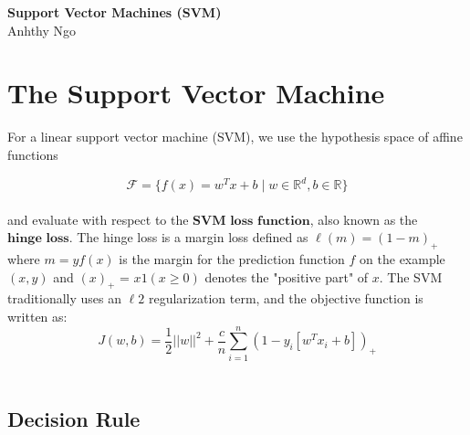 \documentclass[12pt]{article}
\begin{document}
\begin{center}
    \Large \textbf{Support Vector Machines (SVM)} \\
    \small Anhthy Ngo
\end{center}

\section{The Support Vector Machine}



For a linear support vector machine (SVM), we use the hypothesis space of affine functions

$$\mathcal{F} = \{f(x) = w^{T}x + b \mid w \in \mathbb{R}^{d},b \in \mathbb{R}\}$$\\
and evaluate with respect to the $\textbf{SVM loss function}$, also known as the $\textbf{hinge loss}$. The hinge loss is a margin loss defined as $\ell(m) = (1-m)_{+}$ where $m = yf(x)$ is the margin for the prediction function $f$ on the example $(x,y)$ and $(x)_{+}$ = $x1(x \geq 0)$ denotes the "positive part" of $x$. The SVM traditionally uses an $\ell 2$ regularization term, and the objective function is written as:
$$J(w,b) = \frac{1}{2} \lvert \lvert w \rvert \rvert^{2} + \frac{c}{n} \sum_{i=1}^{n} (1 - y_{i}[w^{T}x_{i}+b])_{+}$$\\

\subsection{Decision Rule}
\end{document}
